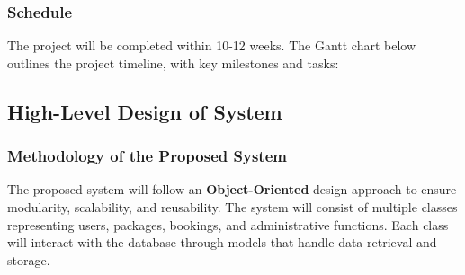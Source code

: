 \subsubsection{Schedule}
The project will be completed within 10-12 weeks. The Gantt chart below outlines the project timeline, with key milestones and tasks:

\begin{table}[ht]
    \caption{Project Schedule for the Travel Agency Website}
    \vspace{0.2in}
    \label{tab:project_schedule}
    \centering
\end{table}


\subsection{High-Level Design of System}

\subsubsection{Methodology of the Proposed System}
The proposed system will follow an \textbf{Object-Oriented} design approach to ensure modularity, scalability, and reusability. The system will consist of multiple classes representing users, packages, bookings, and administrative functions. Each class will interact with the database through models that handle data retrieval and storage.


